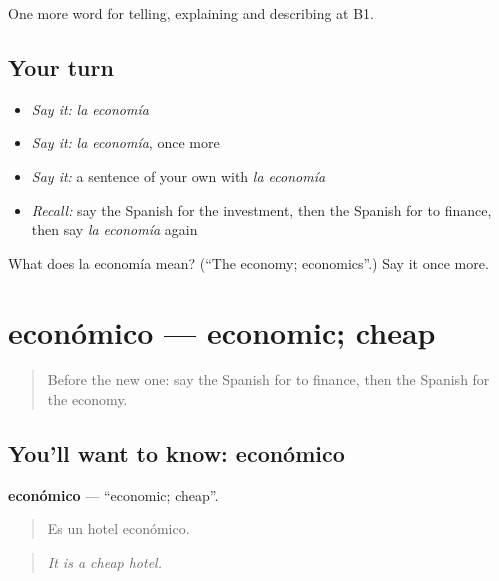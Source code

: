 \begin{grammarlens}[title={What you've built}]
One more word for telling, explaining and describing at B1.
\end{grammarlens}

\subsection*{Your turn}
\begin{itemize}
\raggedright
  \item \emph{Say it:} \emph{la economía}
  \item \emph{Say it:} \emph{la economía}, once more
  \item \emph{Say it:} a sentence of your own with \emph{la economía}
  \item \emph{Recall:} say the Spanish for the investment, then the Spanish for to finance, then say \emph{la economía} again
\end{itemize}

\begin{tcolorbox}[breakable,colback=teal!4,colframe=teal!35!black,title={Before you move on}]
What does la economía mean? (\textquotedblleft{}The economy; economics\textquotedblright{}.) Say it once more.
\end{tcolorbox}
\section[económico]{económico — economic; cheap}

\label{lesson:ES-C630-economico}



\begin{quote}
Before the new one: say the Spanish for to finance, then the Spanish for the economy.
\end{quote}

\subsection*{You'll want to know: económico}
\textbf{económico} — \textquotedblleft{}economic; cheap\textquotedblright{}.

\begin{quote}
Es un hotel económico.
\end{quote}

\begin{quote}
\emph{It is a cheap hotel.}
\end{quote}

